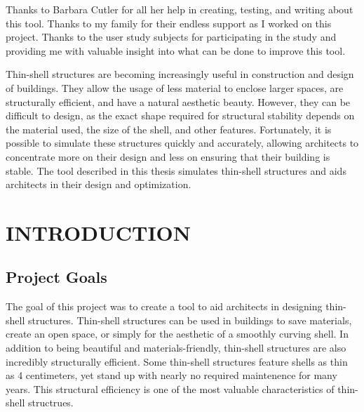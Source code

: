 \documentclass{thesis}
\author{R. Allan Pendergrast}
\begin{document}
 
\titlepage             %
\tableofcontents       %
\listoftables          %
\listoffigures         %

Thanks to Barbara Cutler for all her help in creating, testing, and writing about this tool.  Thanks to my family for their endless
support as I worked on this project.  Thanks to the user study subjects for participating in the study and providing me with valuable
insight into what can be done to improve this tool.

Thin-shell structures are becoming increasingly useful in construction and design of buildings.  They allow the usage of less material to enclose
larger spaces, are structurally efficient, and have a natural aesthetic beauty.  However, they can be difficult to design, as the exact shape
required for structural stability depends on the material used, the size of the shell, and other features.  Fortunately, it is possible to simulate
these structures quickly and accurately, allowing architects to concentrate more on their design and less on ensuring that their building is
stable.  The tool described in this thesis simulates thin-shell structures and aids architects in their design and optimization.

\chapter{INTRODUCTION} \label{chp:introduction}

\section{Project Goals} \label{sec:goals}
The goal of this project was to create a tool to aid architects in designing thin-shell structures.  Thin-shell structures can be used in
buildings to save materials, create an open space, or simply for the aesthetic of a smoothly curving shell.  In addition to being beautiful
and materials-friendly, thin-shell structures are also incredibly structurally efficient.  Some thin-shell structures feature shells as thin
as 4 centimeters, yet stand up with nearly no required maintenence for many years.  This structural efficiency is one of the most valuable
characteristics of thin-shell structrues.
\end{document}
